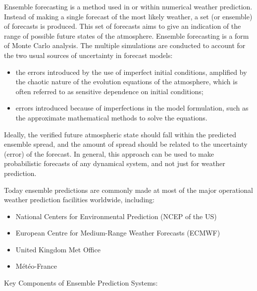 \documentclass[../paper.tex]{subfiles}
\begin{document}
Ensemble forecasting is a method used in or within numerical weather prediction.
Instead of making a single forecast of the most likely weather, a set (or ensemble) of forecasts is produced.
This set of forecasts aims to give an indication of the range of possible future states of the atmosphere.
Ensemble forecasting is a form of Monte Carlo analysis.
The multiple simulations are conducted to account for the two usual sources of uncertainty in forecast models:
\begin{itemize}
    \item the errors introduced by the use of imperfect initial conditions, amplified by the chaotic nature of the evolution equations of the atmosphere, which is often referred to as sensitive dependence on initial conditions;
    \item errors introduced because of imperfections in the model formulation, such as the approximate mathematical methods to solve the equations.
\end{itemize}
Ideally, the verified future atmospheric state should fall within the predicted ensemble spread,
and the amount of spread should be related to the uncertainty (error) of the forecast.
In general, this approach can be used to make probabilistic forecasts of any dynamical system,
and not just for weather prediction.

Today ensemble predictions are commonly made at most of the major operational weather prediction facilities worldwide, including:
\begin{itemize}
    \item National Centers for Environmental Prediction (NCEP of the US)
    \item European Centre for Medium-Range Weather Forecasts (ECMWF)
    \item United Kingdom Met Office
    \item Météo-France
\end{itemize}

Key Components of Ensemble Prediction Systems:
\end{document}
